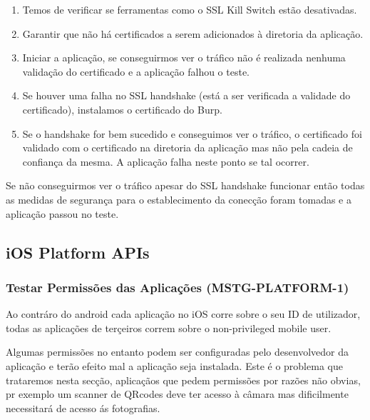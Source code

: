 \begin{enumerate}
\item Temos de verificar se ferramentas como o SSL Kill Switch estão desativadas.\par
\hfill\par
\item Garantir que não há certificados a serem adicionados à diretoria da aplicação.\par
\hfill\par
\item Iniciar a aplicação, se conseguirmos ver o tráfico não é realizada nenhuma validação do certificado e a aplicação falhou o teste.\par
\hfill\par
\item Se houver uma falha no SSL handshake (está a ser verificada a validade do certificado), instalamos o certificado do  Burp.\par
\hfill\par
\item Se o handshake for bem sucedido e conseguimos ver o tráfico, o certificado foi validado com o certificado na diretoria da aplicação mas não pela cadeia de confiança da mesma. A aplicação falha neste ponto se tal ocorrer.
\end{enumerate}


Se não conseguirmos ver o tráfico apesar do SSL handshake funcionar então todas as medidas de segurança para o establecimento da conecção foram tomadas e a aplicação passou no teste.


\subsection{iOS Platform APIs}
\hfill\par


\subsubsection{Testar Permissões das Aplicações (MSTG-PLATFORM-1)}
\hfill\par
\hfill\par

Ao contráro do android  cada aplicação no iOS corre sobre o seu ID de utilizador, todas as aplicações de terçeiros correm sobre o non-privileged mobile user.

Algumas permissões no entanto podem ser configuradas pelo desenvolvedor da aplicação e terão efeito mal a aplicação seja instalada. Este é o problema que trataremos nesta secção, aplicaçãos que pedem permissões por razões não obvias, pr exemplo um scanner de QRcodes deve ter acesso à câmara mas dificilmente necessitará de acesso ás fotografias.\par
\hfill\par

